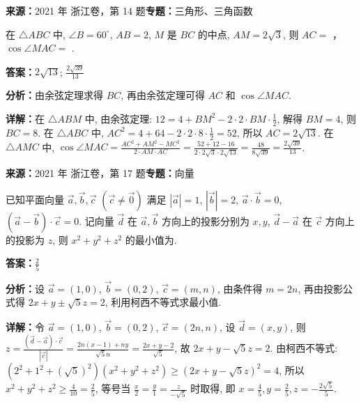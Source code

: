 \begin{question}[points=6]
\textbf{来源：}2021 年 浙江卷，第 14 题\quad \textbf{专题：}三角形、三角函数\par
在 $\triangle ABC$ 中, $\angle B = 60^\circ$, $AB=2$, $M$ 是 $BC$ 的中点, $AM=2\sqrt{3}$, 则 $AC=$ ，$\cos\angle MAC=$ .
\begin{solution}
\textbf{答案：}$2\sqrt{13}$; $\frac{2\sqrt{39}}{13}$

\textbf{分析：}由余弦定理求得 $BC$, 再由余弦定理可得 $AC$ 和 $\cos\angle MAC$.

\textbf{详解：}在 $\triangle ABM$ 中, 由余弦定理: $12=4+BM^2-2\cdot2\cdot BM\cdot\frac12$, 解得 $BM=4$, 则 $BC=8$. 在 $\triangle ABC$ 中, $AC^2=4+64-2\cdot2\cdot8\cdot\frac12=52$, 所以 $AC=2\sqrt{13}$. 在 $\triangle AMC$ 中, $\cos\angle MAC = \frac{AC^2+AM^2-MC^2}{2\cdot AM\cdot AC} = \frac{52+12-16}{2\cdot2\sqrt{3}\cdot2\sqrt{13}} = \frac{48}{8\sqrt{39}} = \frac{2\sqrt{39}}{13}$.
\end{solution}
\end{question}

\begin{question}[points=4]
\textbf{来源：}2021 年 浙江卷，第 17 题\quad \textbf{专题：}向量\par
已知平面向量 $\vec{a},\vec{b},\vec{c}$ $(\vec{c}\neq\vec{0})$ 满足 $|\vec{a}|=1$, $|\vec{b}|=2$, $\vec{a}\cdot\vec{b}=0$, $(\vec{a}-\vec{b})\cdot\vec{c}=0$. 记向量 $\vec{d}$ 在 $\vec{a},\vec{b}$ 方向上的投影分别为 $x,y$, $\vec{d}-\vec{a}$ 在 $\vec{c}$ 方向上的投影为 $z$, 则 $x^2+y^2+z^2$ 的最小值为.
\fillin[{$\frac{2}{5}$}]
\begin{solution}
\textbf{答案：}$\frac{2}{5}$

\textbf{分析：}设 $\vec{a}=(1,0)$, $\vec{b}=(0,2)$, $\vec{c}=(m,n)$, 由条件得 $m=2n$, 再由投影公式得 $2x+y\pm\sqrt{5}z=2$, 利用柯西不等式求最小值.

\textbf{详解：}令 $\vec{a}=(1,0)$, $\vec{b}=(0,2)$, $\vec{c}=(2n,n)$, 设 $\vec{d}=(x,y)$, 则 $z = \frac{(\vec{d}-\vec{a})\cdot\vec{c}}{|\vec{c}|} = \frac{2n(x-1)+ny}{\sqrt{5}n} = \frac{2x+y-2}{\sqrt{5}}$, 故 $2x+y-\sqrt{5}z=2$. 由柯西不等式: $(2^2+1^2+(\sqrt{5})^2)(x^2+y^2+z^2) \geq (2x+y-\sqrt{5}z)^2=4$, 所以 $x^2+y^2+z^2 \geq \frac{4}{10}=\frac{2}{5}$, 等号当 $\frac{x}{2}=\frac{y}{1}=\frac{z}{-\sqrt{5}}$ 时取得, 即 $x=\frac{4}{5},y=\frac{2}{5},z=-\frac{2\sqrt{5}}{5}$.
\end{solution}
\end{question}

